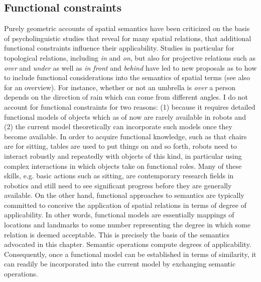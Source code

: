 \subsection{Functional constraints}
Purely geometric accounts of spatial semantics have been criticized
on the basis of psycholinguistic studies that reveal for many spatial relations,
that additional functional constraints influence their applicability. 
Studies in particular for topological relations,
including \emph{in} and \emph{on}, but also for projective relations such as 
\emph{over} and \emph{under} \citep{coventry2001} as well as 
\emph{in front} and
\emph{behind} \citep{carlson1996influence}  have led to new
proposals \citep{coventry2005spatial} as to how to include functional
considerations into the semantics of spatial terms (see also 
\cite{coventry2004saying} for an overview). For instance, 
whether or not an umbrella is \emph{over} a person depends on 
the direction of rain which can come from different angles. 
I do not account for
functional constraints for two reasons: (1) because it requires detailed
functional models of objects which as of now are rarely available
in robots and (2) the current model theoretically can incorporate such models
once they become available. In order to acquire functional 
knowledge, such as that chairs 
are for sitting, tables are used to put things on and so forth, 
robots need to interact robustly and repeatedly with objects 
of this kind, in particular using complex 
interactions in which objects take on functional roles. Many of
these skills, e.g. basic actions such as sitting,
are contemporary research fields in robotics and still need to see 
significant progress before they are generally 
available. On the other hand, functional approaches to semantics
are typically committed to conceive the application of spatial
relations in terms of degree of applicability. In other words, 
functional models are essentially mappings of
locations and landmarks to some number representing the
degree in which some relation is deemed acceptable. This is 
precisely the basis of the semantics advocated in this chapter.
Semantic operations compute degrees of applicability. Consequently, 
once a functional model can be established in terms of similarity,
it can readily be incorporated into the current model by exchanging
semantic operations.

